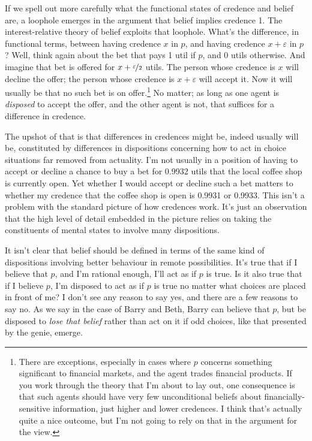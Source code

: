 If we spell out more carefully what the functional states of credence and belief are, a loophole emerges in the argument that belief implies credence 1. The interest-relative theory of belief exploits that loophole. What's the difference, in functional terms, between having credence \(x\) in \(p\), and having credence \(x + \varepsilon\) in \(p\)? Well, think again about the bet that pays 1 util if \(p\), and 0 utils otherwise. And imagine that bet is offered for \(x + \nicefrac{\varepsilon}{2}\) utils. The person whose credence is \(x\) will decline the offer; the person whose credence is \(x + \varepsilon\) will accept it. Now it will usually be that no such bet is on offer.\footnote{There are exceptions, especially in cases where \(p\) concerns something significant to financial markets, and the agent trades financial products. If you work through the theory that I'm about to lay out, one consequence is that such agents should have very few unconditional beliefs about financially-sensitive information, just higher and lower credences. I think that's actually quite a nice outcome, but I'm not going to rely on that in the argument for the view.} No matter; as long as one agent is \textit{disposed} to accept the offer, and the other agent is not, that suffices for a difference in credence.

The upshot of that is that differences in credences might be, indeed usually will be, constituted by differences in dispositions concerning how to act in choice situations far removed from actuality. I'm not usually in a position of having to accept or decline a chance to buy a bet for 0.9932 utils that the local coffee shop is currently open. Yet whether I would accept or decline such a bet matters to whether my credence that the coffee shop is open is 0.9931 or 0.9933. This isn't a problem with the standard picture of how credences work. It's just an observation that the high level of detail embedded in the picture relies on taking the constituents of mental states to involve many dispositions.

It isn't clear that belief should be defined in terms of the same kind of dispositions involving better behaviour in remote possibilities. It's true that if I believe that \(p\), and I'm rational enough, I'll act as if \(p\) is true. Is it also true that if I believe \(p\), I'm disposed to act as if \(p\) is true no matter what choices are placed in front of me? I don't see any reason to say yes, and there are a few reasons to say no. As we say in the case of Barry and Beth, Barry can believe that \(p\), but be disposed to \textit{lose that belief} rather than act on it if odd choices, like that presented by the genie, emerge.

